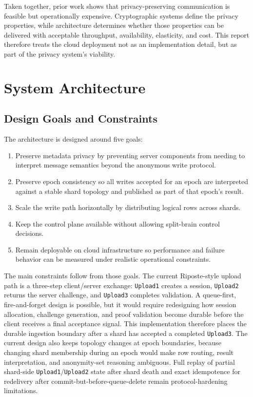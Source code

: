 \documentclass[conference]{IEEEtran}
\begin{document}
Taken together, prior work shows that privacy-preserving communication is feasible but operationally expensive. Cryptographic systems define the privacy properties, while architecture determines whether those properties can be delivered with acceptable throughput, availability, elasticity, and cost. This report therefore treats the cloud deployment not as an implementation detail, but as part of the privacy system's viability.

\section{System Architecture}

\subsection{Design Goals and Constraints}

The architecture is designed around five goals:
\begin{enumerate}
\item Preserve metadata privacy by preventing server components from needing to interpret message semantics beyond the anonymous write protocol.
\item Preserve epoch consistency so all writes accepted for an epoch are interpreted against a stable shard topology and published as part of that epoch's result.
\item Scale the write path horizontally by distributing logical rows across shards.
\item Keep the control plane available without allowing split-brain control decisions.
\item Remain deployable on cloud infrastructure so performance and failure behavior can be measured under realistic operational constraints.
\end{enumerate}

The main constraints follow from those goals. The current Riposte-style upload path is a three-step client/server exchange: \texttt{Upload1} creates a session, \texttt{Upload2} returns the server challenge, and \texttt{Upload3} completes validation. A queue-first, fire-and-forget design is possible, but it would require redesigning how session allocation, challenge generation, and proof validation become durable before the client receives a final acceptance signal. This implementation therefore places the durable ingestion boundary after a shard has accepted a completed \texttt{Upload3}. The current design also keeps topology changes at epoch boundaries, because changing shard membership during an epoch would make row routing, result interpretation, and anonymity-set reasoning ambiguous. Full replay of partial shard-side \texttt{Upload1}/\texttt{Upload2} state after shard death and exact idempotence for redelivery after commit-but-before-queue-delete remain protocol-hardening limitations.
\end{document}

